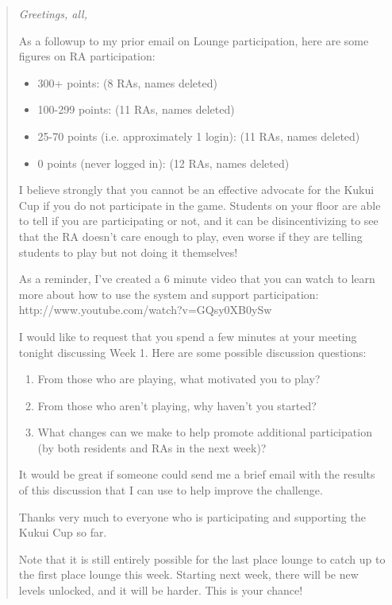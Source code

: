 \documentclass[]{article}
\begin{document}
\begin{quotation}
{\em 
\noindent Greetings, all,

\noindent As a followup to my prior email on Lounge participation, here are some
figures on RA participation:
\begin{itemize}[noitemsep]
\item 300+ points: (8 RAs, names deleted)
\item 100-299 points: (11 RAs, names deleted)
\item 25-70 points (i.e. approximately 1 login): (11 RAs, names deleted)
\item 0 points (never logged in): (12 RAs, names deleted)
\end{itemize}

I believe strongly that you cannot be an effective advocate for the
Kukui Cup if you do not participate in the game.  Students on your
floor are able to tell if you are participating or not, and it can be
disincentivizing to see that the RA doesn't care enough to play, even
worse if they are telling students to play but not doing it
themselves!

As a reminder, I've created a 6 minute video that you can watch to
learn more about how to use the system and support participation:
http://www.youtube.com/watch?v=GQsy0XB0ySw

I would like to request that you spend a few minutes at your meeting
tonight discussing Week 1.  Here are some possible discussion
questions:
\begin{enumerate}[noitemsep]
\item From those who are playing, what motivated you to play?
\item From those who aren't playing, why haven't you started?
\item What changes can we make to help promote additional participation
(by both residents and RAs in the next week)?
\end{enumerate}

It would be great if someone could send me a brief email with the
results of this discussion that I can use to help improve the
challenge.

Thanks very much to everyone who is participating and supporting the
Kukui Cup so far.

Note that it is still entirely possible for the last place lounge to
catch up to the first place lounge this week.   Starting next week,
there will be new levels unlocked, and it will be harder.   This is
your chance!
}
\end{quotation}
\end{document}
